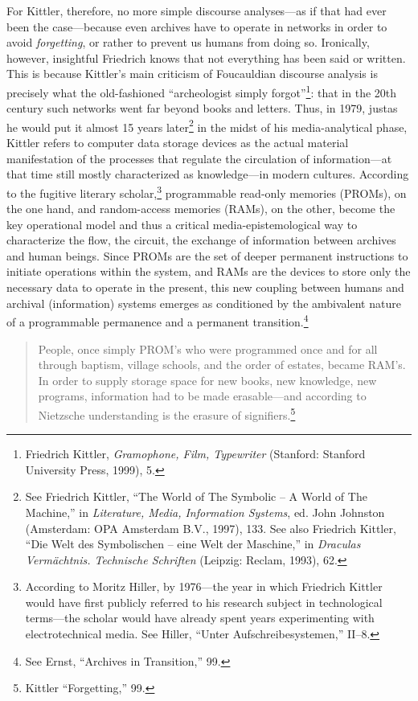\documentclass{tufte-handout}
\begin{document}
\noindent 
For Kittler, therefore, no more simple discourse analyses---as if that
had ever been the case---because even archives have to operate in
networks in order to avoid \emph{forgetting}, or rather to prevent us
humans from doing so. Ironically, however, insightful Friedrich knows
that not everything has been said or written. This is because Kittler's
main criticism of Foucauldian discourse analysis is precisely what the
old-fashioned ``archeologist simply forgot''\footnote{Friedrich Kittler,
  \emph{Gramophone, Film, Typewriter} (Stanford: Stanford University
  Press, 1999), 5.}: that in the 20th century such networks went far
beyond books and letters. Thus, in 1979, just\newpage\noindent as he would put it almost
15 years later\footnote{See Friedrich Kittler, ``The World of The
  Symbolic -- A World of The Machine,'' in \emph{Literature, Media,
  Information Systems}, ed. John Johnston (Amsterdam: OPA Amsterdam
  B.V., 1997), 133. See also Friedrich Kittler, ``Die Welt des
  Symbolischen -- eine Welt der Maschine,'' in \emph{Draculas
  Vermächtnis. Technische Schriften} (Leipzig: Reclam, 1993), 62.} in
the midst of his media-analytical phase, Kittler refers to computer data
storage devices as the actual material manifestation of the processes
that regulate the circulation of information---at that time still mostly
characterized as knowledge---in modern cultures. According to the
fugitive literary scholar,\footnote{According to Moritz Hiller, by
  1976---the year in which Friedrich Kittler would have first publicly
  referred to his research subject in technological terms---the scholar
  would have already spent years experimenting with electrotechnical
  media. See Hiller, ``Unter Aufschreibesystemen,'' II--8.} programmable
read-only memories (PROMs), on the one hand, and random-access memories
(RAMs), on the other, become the key operational model and thus a
critical media-epistemological way to characterize the flow, the
circuit, the exchange of information between archives and human beings.
Since PROMs are the set of deeper permanent instructions to initiate
operations within the system, and RAMs are the devices to store only the
necessary data to operate in the present, this new coupling between
humans and archival (information) systems emerges as conditioned by the
ambivalent nature of a programmable permanence and a permanent
transition.\footnote{See Ernst, ``Archives in Transition,'' 99.}

\begin{quote}
People, once simply PROM's who were programmed once and for all through
baptism, village schools, and the order of estates, became RAM's. In
order to supply storage space for new books, new knowledge, new
programs, information had to be made erasable---and according to
Nietzsche understanding is the erasure of signifiers.\footnote{Kittler
  ``Forgetting,'' 99.}
\end{quote}
\end{document}
